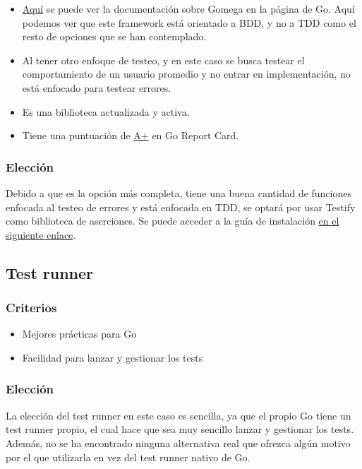 \begin{itemize}
\item
  \href{https://pkg.go.dev/github.com/onsi/gomega}{Aquí} se puede ver la
  documentación sobre Gomega en la página de Go. Aquí podemos ver que
  este framework está orientado a BDD, y no a TDD como el resto de
  opciones que se han contemplado.
\item
  Al tener otro enfoque de testeo, y en este caso se busca testear el
  comportamiento de un usuario promedio y no entrar en implementación,
  no está enfocado para testear errores.
\item
  Es una biblioteca actualizada y activa.
\item
  Tiene una puntuación de
  \href{https://goreportcard.com/report/github.com/onsi/gomega}{A+} en
  Go Report Card.
\end{itemize}

\subsubsection{Elección}

Debido a que es la opción más completa, tiene una buena cantidad de
funciones enfocada al testeo de errores y está enfocada en TDD, se
optará por usar Testify como biblioteca de aserciones. Se puede acceder a
la guía de instalación
\href{https://pkg.go.dev/github.com/stretchr/testify\#section-readme}{en
el siguiente enlace}.

\subsection{Test runner}

\subsubsection{Criterios}

\begin{itemize}
\item
  Mejores prácticas para Go
\item
  Facilidad para lanzar y gestionar los tests
\end{itemize}

\subsubsection{Elección}

La elección del test runner en este caso es sencilla, ya que el propio Go
tiene un test runner propio, el cual hace que sea muy sencillo lanzar y
gestionar los tests. Además, no se ha encontrado ninguna alternativa
real que ofrezca algún motivo por el que utilizarla en vez del test runner
nativo de Go.

